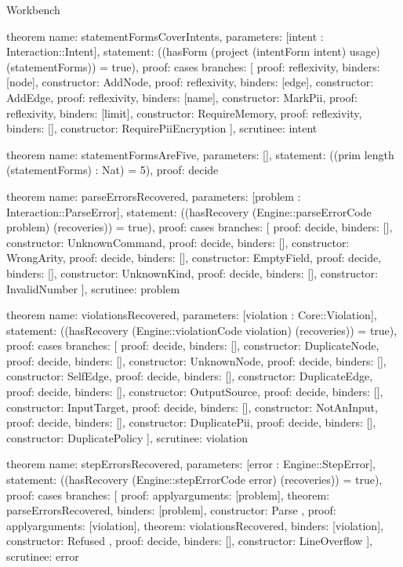 \begin{lexlean}{Workbench}
\begin{semanticmodule}
theorem{
  name: statementFormsCoverIntents,
  parameters: [intent : Interaction::Intent],
  statement: ((hasForm (project (intentForm intent) usage) (statementForms)) = true),
  proof: cases{
    branches: [
      {proof: reflexivity{}, binders: [node], constructor: AddNode},
      {proof: reflexivity{}, binders: [edge], constructor: AddEdge},
      {proof: reflexivity{}, binders: [name], constructor: MarkPii},
      {proof: reflexivity{}, binders: [limit], constructor: RequireMemory},
      {proof: reflexivity{}, binders: [], constructor: RequirePiiEncryption}
    ],
    scrutinee: intent
  }
}

theorem{
  name: statementFormsAreFive,
  parameters: [],
  statement: ((prim length (statementForms) : Nat) = 5),
  proof: decide{}
}

theorem{
  name: parseErrorsRecovered,
  parameters: [problem : Interaction::ParseError],
  statement: ((hasRecovery (Engine::parseErrorCode problem) (recoveries)) = true),
  proof: cases{
    branches: [
      {proof: decide{}, binders: [], constructor: UnknownCommand},
      {proof: decide{}, binders: [], constructor: WrongArity},
      {proof: decide{}, binders: [], constructor: EmptyField},
      {proof: decide{}, binders: [], constructor: UnknownKind},
      {proof: decide{}, binders: [], constructor: InvalidNumber}
    ],
    scrutinee: problem
  }
}

theorem{
  name: violationsRecovered,
  parameters: [violation : Core::Violation],
  statement: ((hasRecovery (Engine::violationCode violation) (recoveries)) = true),
  proof: cases{
    branches: [
      {proof: decide{}, binders: [], constructor: DuplicateNode},
      {proof: decide{}, binders: [], constructor: UnknownNode},
      {proof: decide{}, binders: [], constructor: SelfEdge},
      {proof: decide{}, binders: [], constructor: DuplicateEdge},
      {proof: decide{}, binders: [], constructor: OutputSource},
      {proof: decide{}, binders: [], constructor: InputTarget},
      {proof: decide{}, binders: [], constructor: NotAnInput},
      {proof: decide{}, binders: [], constructor: DuplicatePii},
      {proof: decide{}, binders: [], constructor: DuplicatePolicy}
    ],
    scrutinee: violation
  }
}

theorem{
  name: stepErrorsRecovered,
  parameters: [error : Engine::StepError],
  statement: ((hasRecovery (Engine::stepErrorCode error) (recoveries)) = true),
  proof: cases{
    branches: [
      {
        proof: apply{arguments: [problem], theorem: parseErrorsRecovered},
        binders: [problem],
        constructor: Parse
      },
      {
        proof: apply{arguments: [violation], theorem: violationsRecovered},
        binders: [violation],
        constructor: Refused
      },
      {proof: decide{}, binders: [], constructor: LineOverflow}
    ],
    scrutinee: error
  }
}


\end{semanticmodule}
\end{lexlean}
